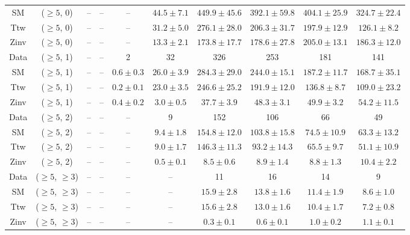 \begin{table}[h!]
{\begin{tabular}{cccccccccc}
	SM & ($\ge5$, 0) & -- & -- & -- & $44.5\pm 7.1$ & $449.9\pm 45.6$ & $392.1\pm 59.8$ & $404.1\pm 25.9$ & $324.7\pm 22.4$ \\[0.5ex] 
	Ttw & ($\ge5$, 0) & -- & -- & -- & $31.2\pm 5.0$ & $276.1\pm 28.0$ & $206.3\pm 31.7$ & $197.9\pm 12.9$ & $126.1\pm 8.2$ \\[0.5ex] 
	Zinv & ($\ge5$, 0) & -- & -- & -- & $13.3\pm 2.1$ & $173.8\pm 17.7$ & $178.6\pm 27.8$ & $205.0\pm 13.1$ & $186.3\pm 12.0$ \\[0.5ex] 
	Data & ($\ge5$, 1) & -- & -- & 2 & 32 & 326 & 253 & 181 & 141 \\[0.5ex] 
	SM & ($\ge5$, 1) & -- & -- & $0.6\pm 0.3$ & $26.0\pm 3.9$ & $284.3\pm 29.0$ & $244.0\pm 15.1$ & $187.2\pm 11.7$ & $168.7\pm 35.1$ \\[0.5ex] 
	Ttw & ($\ge5$, 1) & -- & -- & $0.2\pm 0.1$ & $23.0\pm 3.5$ & $246.6\pm 25.2$ & $191.9\pm 12.0$ & $136.8\pm 8.7$ & $109.0\pm 23.2$ \\[0.5ex] 
	Zinv & ($\ge5$, 1) & -- & -- & $0.4\pm 0.2$ & $3.0\pm 0.5$ & $37.7\pm 3.9$ & $48.3\pm 3.1$ & $49.9\pm 3.2$ & $54.2\pm 11.5$ \\[0.5ex] 
	Data & ($\ge5$, 2) & -- & -- & -- & 9 & 152 & 106 & 66 & 49 \\[0.5ex] 
	SM & ($\ge5$, 2) & -- & -- & -- & $9.4\pm 1.8$ & $154.8\pm 12.0$ & $103.8\pm 15.8$ & $74.5\pm 10.9$ & $63.3\pm 13.2$ \\[0.5ex] 
	Ttw & ($\ge5$, 2) & -- & -- & -- & $9.0\pm 1.7$ & $146.3\pm 11.3$ & $93.2\pm 14.3$ & $65.5\pm 9.7$ & $51.1\pm 10.9$ \\[0.5ex] 
	Zinv & ($\ge5$, 2) & -- & -- & -- & $0.5\pm 0.1$ & $8.5\pm 0.6$ & $8.9\pm 1.4$ & $8.8\pm 1.3$ & $10.4\pm 2.2$ \\[0.5ex] 
	Data & ($\ge5$, $\ge3$) & -- & -- & -- & -- & 11 & 16 & 14 & 9 \\[0.5ex] 
	SM & ($\ge5$, $\ge3$) & -- & -- & -- & -- & $15.9\pm 2.8$ & $13.8\pm 1.6$ & $11.4\pm 1.9$ & $8.6\pm 1.0$ \\[0.5ex] 
	Ttw & ($\ge5$, $\ge3$) & -- & -- & -- & -- & $15.6\pm 2.8$ & $13.0\pm 1.6$ & $10.4\pm 1.7$ & $7.2\pm 0.8$ \\[0.5ex] 
	Zinv & ($\ge5$, $\ge3$) & -- & -- & -- & -- & $0.3\pm 0.1$ & $0.6\pm 0.1$ & $1.0\pm 0.2$ & $1.1\pm 0.1$ \\[0.5ex] 
	\hline
	\hline
\end{tabular}}
\end{table}
